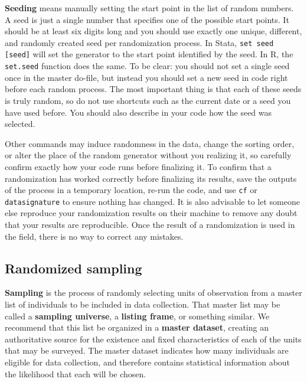 \textbf{Seeding} means manually setting the start point in the list of random numbers.
A seed is just a single number that specifies one of the possible start points.
It should be at least six digits long and you should use exactly
one unique, different, and randomly created seed per randomization process.
In Stata, \texttt{set seed [seed]} will set the generator
to the start point identified by the seed.
In R, the \texttt{set.seed} function does the same.
To be clear: you should not set a single seed once in the master do-file,
but instead you should set a new seed in code right before each random process.
The most important thing is that each of these seeds is truly random,
so do not use shortcuts such as the current date or a seed you have used before.
You should also describe in your code how the seed was selected.

Other commands may induce randomness in the data,
change the sorting order,
or alter the place of the random generator without you realizing it,
so carefully confirm exactly how your code runs before finalizing it.
To confirm that a randomization has worked correctly before finalizing its results,
save the outputs of the process in a temporary location,
re-run the code, and use \texttt{cf} or \texttt{datasignature} to ensure
nothing has changed. It is also advisable to let someone else reproduce your
randomization results on their machine to remove any doubt that your results
are reproducible.
Once the result of a randomization is used in the field,
there is no way to correct any mistakes.




\subsection{Randomized sampling}

\textbf{Sampling} is the process of randomly selecting units of observation
from a master list of individuals to be included in data collection.
That master list may be called a \textbf{sampling universe}, a \textbf{listing frame}, or something similar.
We recommend that this list be organized in a \textbf{master dataset},
creating an authoritative source for the existence and fixed
characteristics of each of the units that may be surveyed.
The master dataset indicates how many individuals are eligible for data collection,
and therefore contains statistical information about
the likelihood that each will be chosen.

